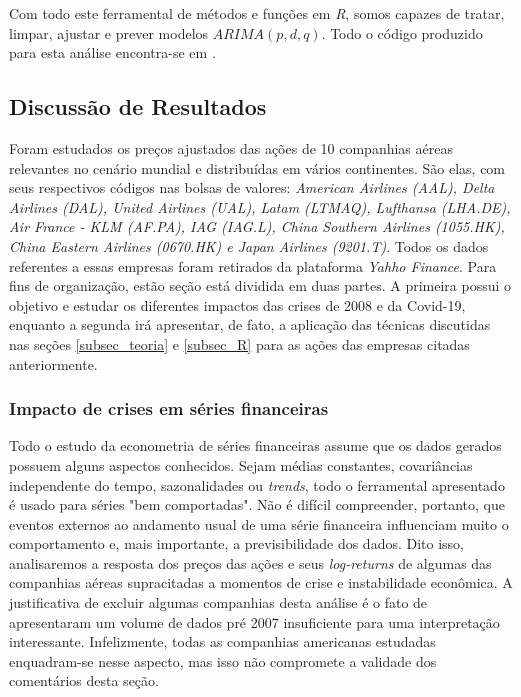 \documentclass[12pt]{article}
\begin{document}
Com todo este ferramental de métodos e funções em \textit{R}, somos capazes de tratar, limpar, ajustar e prever modelos $ARIMA(p,d,q)$. Todo o código produzido para esta análise encontra-se em \cite{git}.
\subsection{Discussão de Resultados}\label{subsec_res}
Foram estudados os preços ajustados das ações de 10 companhias aéreas relevantes no cenário mundial e distribuídas em vários continentes. São elas, com seus respectivos códigos nas bolsas de valores: \emph{American Airlines (AAL), Delta Airlines (DAL), United Airlines (UAL), Latam (LTMAQ), Lufthansa (LHA.DE), Air France - KLM (AF.PA), IAG (IAG.L), China Southern Airlines (1055.HK), China Eastern Airlines (0670.HK) e Japan Airlines (9201.T)}. Todos os dados referentes a essas empresas foram retirados da plataforma \textit{Yahho Finance}. Para fins de organização, estão seção está dividida em duas partes. A primeira possui o objetivo e estudar os diferentes impactos das crises de 2008 e da Covid-19, enquanto a segunda irá apresentar, de fato, a aplicação das técnicas discutidas nas seções \ref{subsec_teoria} e \ref{subsec_R} para as ações das empresas citadas anteriormente.

\subsubsection{Impacto de crises em séries financeiras}\label{subsec_crise}
Todo o estudo da econometria de séries financeiras \cite{Tsay} assume que os dados gerados possuem alguns aspectos conhecidos. Sejam médias constantes, covariâncias independente do tempo, sazonalidades ou \textit{trends}, todo o ferramental apresentado é usado para séries "bem comportadas". Não é difícil compreender, portanto, que eventos externos ao andamento usual de uma série financeira influenciam muito o comportamento e, mais importante, a previsibilidade dos dados. Dito isso, analisaremos a resposta dos preços das ações e seus \textit{log-returns} de algumas das companhias aéreas supracitadas a momentos de crise e instabilidade econômica. A justificativa de excluir algumas companhias desta análise é o fato de apresentaram um volume de dados pré 2007 insuficiente para uma interpretação interessante. Infelizmente, todas as companhias americanas estudadas enquadram-se nesse aspecto, mas isso não compromete a validade dos comentários desta seção.
\end{document}
